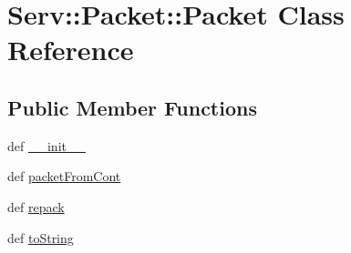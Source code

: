 \hypertarget{class_serv_1_1_packet_1_1_packet}{
\section{Serv::Packet::Packet Class Reference}
\label{class_serv_1_1_packet_1_1_packet}
}
\subsection*{Public Member Functions}
\begin{CompactItemize}
\item 
def \hyperlink{class_serv_1_1_packet_1_1_packet_1f71ef65b348c86a047c87abe9ca2775}{\_\-\_\-init\_\-\_\-}
\item 
def \hyperlink{class_serv_1_1_packet_1_1_packet_393243697bc1e23d5adadc50698fccd1}{packetFromCont}
\item 
def \hyperlink{class_serv_1_1_packet_1_1_packet_6dab330b602405f42b3fe090863e5c1e}{repack}
\item 
def \hyperlink{class_serv_1_1_packet_1_1_packet_2738b48c8c177150338082c936c823dc}{toString}
\end{CompactItemize}
